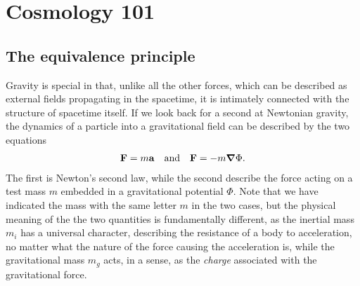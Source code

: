 \chapter{Cosmology 101}
\label{chap:cosmo}



\section{The equivalence principle}

Gravity is special in that, unlike all the other forces, which can be described as
external fields propagating in the spacetime, it is intimately connected with the
structure of spacetime itself. If we look back for a second at Newtonian gravity,
the dynamics of a particle into a gravitational field can be described by the two
equations
\begin{align*}
  \vb{F} = m\vb{a} \quad \text{and} \quad \vb{F} = -m\grad{\Phi}.
\end{align*}
The first is Newton's second law, while the second describe the force acting on a
test mass $m$ embedded in a gravitational potential $\Phi$. Note that we have indicated
the mass with the same letter $m$ in the two cases, but the physical meaning of the
the two quantities is fundamentally different, as the inertial mass $m_i$ has a
universal character, describing the resistance of a body to acceleration, no matter
what the nature of the force causing the acceleration is, while the gravitational
mass $m_g$ acts, in a sense, as the \emph{charge} associated with the gravitational
force.

